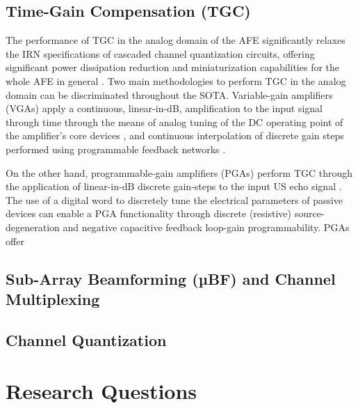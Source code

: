 \par

\subsection{Time-Gain Compensation (TGC)}
\label{subsec:sub_array_beamforming_afes}

The performance of TGC in the analog domain of the AFE significantly relaxes the IRN specifications of cascaded channel quantization circuits, offering significant power dissipation reduction and miniaturization capabilities for the whole AFE in general \cite{}. Two main methodologies to perform TGC in the analog domain can be discriminated throughout the SOTA. Variable-gain amplifiers (VGAs) apply a continuous, linear-in-dB, amplification to the input signal through time through the means of analog tuning of the DC operating point of the amplifier's core devices \cite{}, and continuous interpolation of discrete gain steps performed using programmable feedback networks \cite{}. 

On the other hand, programmable-gain amplifiers (PGAs) perform TGC through the application of linear-in-dB discrete gain-steps to the input US echo signal \cite{}. The use of a digital word to discretely tune the electrical parameters of passive devices can enable a PGA functionality through discrete (resistive) source-degeneration and negative capacitive feedback loop-gain programmability. PGAs offer 

\subsection{Sub-Array Beamforming (µBF) and Channel Multiplexing}
\label{subsec:multiplexed_afes}



\subsection{Channel Quantization}
\label{subsec:on_chip_channel_quantization}

\section{Research Questions}
\label{sec:research_questions}


